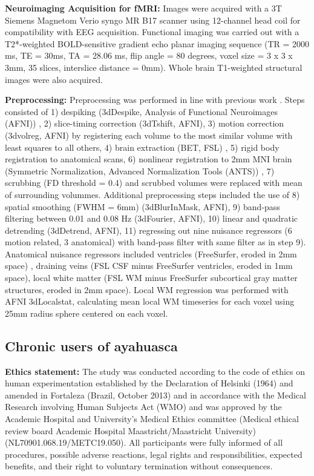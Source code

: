 \textbf{Neuroimaging Acquisition for fMRI:} Images were acquired with a
3T Siemens Magnetom Verio syngo MR B17 scanner using 12-channel head
coil for compatibility with EEG acquisition. Functional imaging was
carried out with a T2*-weighted BOLD-sensitive gradient echo planar
imaging sequence (TR = 2000 ms, TE = 30ms, TA = 28.06 ms, flip angle =
80 degrees, voxel size = 3 x 3 x 3mm, 35 slices, interslice distance =
0mm). Whole brain T1-weighted structural images were also acquired.

\textbf{Preprocessing:} Preprocessing was performed in line with
previous work \parencite{Timmermann2023}. Steps consisted of 1) despiking
(3dDespike, Analysis of Functional Neuroimages (AFNI)) \parencite{Cox1996}, 2)
slice-timing correction (3dTshift, AFNI), 3) motion correction
(3dvolreg, AFNI) by registering each volume to the most similar volume
with least squares to all others, 4) brain extraction (BET, FSL) \parencite{Smith2004}, 5) rigid body registration to anatomical scans, 6)
nonlinear registration to 2mm MNI brain (Symmetric Normalization,
Advanced Normalization Tools (ANTS)) \parencite{Avants2009}, 7) scrubbing
(FD threshold = 0.4) and scrubbed volumes were replaced with mean of
surrounding volummes. Additional preprocessing steps included the use of
8) spatial smoothing (FWHM = 6mm) (3dBlurInMask, AFNI), 9) band-pass
filtering between 0.01 and 0.08 Hz (3dFourier, AFNI), 10) linear and
quadratic detrending (3dDetrend, AFNI), 11) regressing out nine nuisance
regressors (6 motion related, 3 anatomical) with band-pass filter with
same filter as in step 9). Anatomical nuisance regressors included
ventricles (FreeSurfer, eroded in 2mm space) \parencite{Dale1999},
draining veins (FSL CSF minus FreeSurfer ventricles, eroded in 1mm
space), local white matter (FSL WM minus FreeSurfer subcortical gray
matter structures, eroded in 2mm space). Local WM regression was
performed with AFNI 3dLocalstat, calculating mean local WM timeseries
for each voxel using 25mm radius sphere centered on each voxel.
\subsection{Chronic users of ayahuasca} 
\textbf{Ethics statement:} 
The study was conducted according to the code of ethics on human experimentation established by the Declaration of Helsinki (1964) and amended in Fortaleza (Brazil, October 2013) and in accordance with the Medical Research involving Human Subjects Act (WMO) and was approved by the Academic Hospital and University's Medical Ethics committee (Medical ethical review board Academic Hospital Maastricht/Maastricht University)\\ (NL70901.068.19/METC19.050). All participants were fully informed of all
procedures, possible adverse reactions, legal rights and
responsibilities, expected benefits, and their right to voluntary
termination without consequences.

